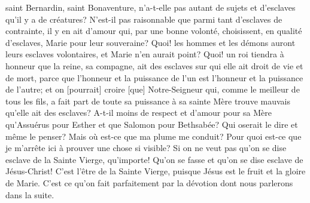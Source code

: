 saint Bernardin, saint Bonaventure, n'a-t-elle pas autant de sujets et d'esclaves qu'il y a de créatures? N'est-il pas
raisonnable que parmi tant d'esclaves de contrainte, il y en ait d'amour qui, par une bonne volonté, choisissent, en
qualité d'esclaves, Marie pour leur souveraine? Quoi! les hommes et les démons auront leurs esclaves volontaires,
et Marie n'en aurait point? Quoi! un roi tiendra à honneur que la reine, sa compagne, ait des esclaves sur qui elle
ait droit de vie et de mort, parce que l'honneur et la puissance de l'un est l'honneur et la puissance de l'autre; et on
[pourrait] croire [que] Notre-Seigneur qui, comme le meilleur de tous les fils, a fait part de toute sa puissance à sa
sainte Mère trouve mauvais qu'elle ait des esclaves? A-t-il moins de respect et d'amour pour sa Mère qu'Assuérus
pour Esther et que Salomon pour Bethsabée? Qui oserait le dire et même le penser?
 Mais où est-ce que ma plume me conduit? Pour quoi est-ce que je m'arrête ici à prouver une chose si visible?
Si on ne veut pas qu'on se dise esclave de la Sainte Vierge, qu'importe! Qu'on se fasse et qu'on se dise esclave
de Jésus-Christ! C'est l'être de la Sainte Vierge, puisque Jésus est le fruit et la gloire de Marie. C'est ce qu'on fait
parfaitement par la dévotion dont nous parlerons dans la suite.
